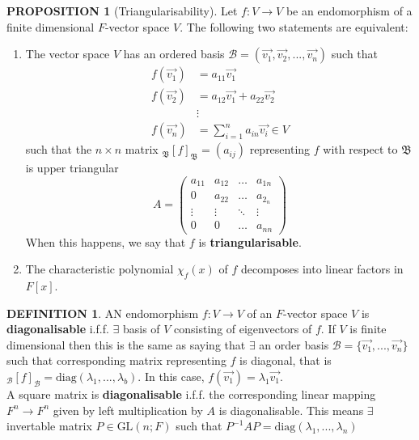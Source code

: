 \documentclass[10pt]{article}
\theoremstyle{definition}
\newtheorem{definition}{DEFINITION}[subsection]
\newtheorem{prop}{PROPOSITION}[subsection]
\begin{document}
\begin{prop}[Triangularisability]
    Let $f:V\rightarrow V$ be an endomorphism of a finite dimensional $F$-vector space $V$. The following two statements are equivalent:
    \begin{enumerate}
        \item The vector space $V$ has an ordered basis $\mathcal{B} = (\vec{v_1},\vec{v_2},...,\vec{v_n})$ such that
                \[\begin{split}
                    f(\vec{v_1}) &= a_{11}\vec{v_1}\\
                    f(\vec{v_2}) &= a_{12}\vec{v_1} + a_{22}\vec{v_2}\\
                    &\vdots\\
                    f(\vec{v_n}) &= \sum_{i=1}^n a_{in}\vec{v_i} \in V
                \end{split}\]
                such that the $n \times n$ matrix $_\mathfrak{B}[f]_\mathfrak{B} = (a_{ij})$ representing $f$ with respect to $\mathfrak{B}$ is upper triangular
                $$A = \begin{pmatrix}
                    a_{11} & a_{12} & \hdots & a_{1n}\\
                    0 & a_{22} & \hdots & a_{2_n}\\
                    \vdots & \vdots & \ddots & \vdots\\
                    0 & 0 & \hdots & a_{nn}
                \end{pmatrix}$$
                When this happens, we say that $f$ is \textbf{triangularisable}.
        \item The characteristic polynomial $\chi_f(x)$ of $f$ decomposes into linear factors in $F[x]$.
    \end{enumerate}
\end{prop}

\begin{definition}
    AN endomorphism $f:V \rightarrow V$ of an $F$-vector space $V$ is \textbf{diagonalisable} i.f.f. $\exists$ basis of $V$ consisting of eigenvectors of $f$. If $V$ is finite dimensional then this is the same as saying that $\exists$ an order basis $\mathcal{B} = \{\vec{v_1}, ..., \vec{v_n}\}$ such that corresponding matrix representing $f$ is diagonal, that is $_\mathcal{B}[f]_\mathcal{B} = \text{diag}(\lambda_1,...,\lambda_b)$. In this case, $f(\vec{v_1}) = \lambda_1\vec{v_1}$.\\
    A square matrix is \textbf{diagonalisable} i.f.f. the corresponding linear mapping $F^n \rightarrow F^n$ given by left multiplication by $A$ is diagonalisable. This means $\exists$ invertable matrix $P\in \text{GL}(n;F)$ such that $P^{-1}AP = \text{diag}(\lambda_1, ...,\lambda_n)$
\end{definition}
\end{document}
